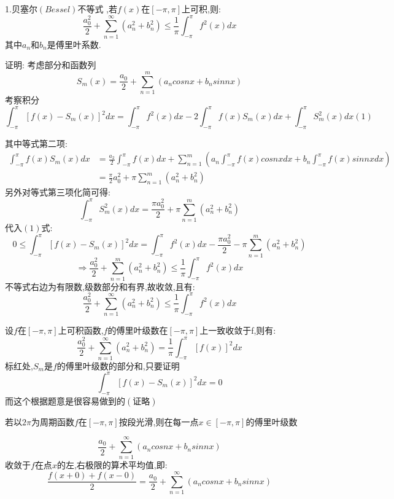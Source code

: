 \documentclass{ctexart}
\begin{document}
\begin{tcolorbox}[title = {贝塞尔不等式},colbacktitle=green!35!black,colback=green!1,arc = 3mm, outer arc = 3mm,fonttitle = \itshape, fontupper = \itshape, fontlower = \itshape]
 		1.贝塞尔$\left(Bessel \right) $不等式 ,若$f(x)$在$\left[-\pi ,\pi \right]$上可积,则:\\
 	$$\frac{a_{0}^{2}}{2}+\sum_{n=1}^{\infty}\left(a_{n}^{2}+b_{n}^{2} \right) \le \frac{1}{\pi}\int_{-\pi}^{\pi}f^{2}(x)dx $$其中$a_{n}$和$b_{n}$是傅里叶系数.

 	{\color{red}证明:}
 	 考虑部分和函数列$$S_{m}(x)=\frac{a_{0}}{2}+\sum_{n=1}^{m}\left( a_{n}cosnx+b_{n}sinnx\right) $$
 	 考察积分
 	$$
 	 \int_{-\pi}^{\pi}\left[f(x)-S_{m}(x)\right]^{2}dx=\int_{-\pi}^{\pi}f^{2}(x)dx-2\int_{-\pi}^{\pi}f(x)S_{m}(x)dx+\int_{-\pi}^{\pi}S_{m}^{2}(x)dx \left( {\text{1}}\right) 
 	 $$
 	 
 	 其中等式第二项:
 \begin{align*}
 	 	\int_{-\pi}^{\pi}f(x)S_{m}(x)dx&=\frac{a_{2}}{2}\int_{-\pi}^{\pi}f(x)dx+\sum_{n=1}^{m}\left(a_{n}\int_{-\pi}^{\pi}f(x)cosnxdx+b_{n}\int_{-\pi}^{\pi}f(x)sinnxdx\right)\\
 	 	&=\frac{\pi}{2}a_{0}^{2}+\pi\sum_{n=1}^{m}\left(a_{n}^{2}+b_{n}^{2}\right) 
 \end{align*}
  另外对等式第三项化简可得:$$\int_{-\pi}^{\pi}S_{m}^{2}(x)dx=\frac{\pi a_{0}^{2}}{2}+\pi\sum_{n=1}^{m}\left(a_{n}^{2}+b_{n}^{2}\right)$$
  代入$(1)$式:
  {\color{red}
   $$0 \le \int_{-\pi}^{\pi}\left[f(x)-S_{m}(x)\right]^{2}dx =\int_{-\pi}^{\pi}f^{2}(x)dx-\frac{\pi a_{0}^{2}}{2}-\pi\sum_{n=1}^{m}\left(a_{n}^{2}+b_{n}^{2} \right) $$}
   $$\Rightarrow \frac{ a_{0}^{2}}{2}+\sum_{n=1}^{m}\left(a_{n}^{2}+b_{n}^{2} \right) \le \frac{1}{\pi}\int_{-\pi}^{\pi}f^{2}(x)dx$$
   不等式右边为有限数,级数部分和有界,故收敛,且有:
   $$\frac{a_{0}^{2}}{2}+\sum_{n=1}^{\infty}\left(a_{n}^{2}+b_{n}^{2} \right) \le \frac{1}{\pi}\int_{-\pi}^{\pi}f^{2}(x)dx $$	
\end{tcolorbox}
\begin{tcolorbox}[title = {帕塞瓦尔等式},colbacktitle=green!35!black,colback=green!1,arc = 3mm, outer arc = 3mm,fonttitle = \itshape, fontupper = \itshape, fontlower = \itshape]
	设$f$在$[-\pi,\pi]$上可积函数,$f$的傅里叶级数在$[-\pi,\pi]$上一致收敛于f,则有:$$\frac{a_{0}^{2}}{2}+\sum_{n=1}^{\infty}\left(a_{n}^{2}+b_{n}^{2} \right) =\frac{1}{\pi}\int_{-\pi}^{\pi}[f(x)]^{2} dx $$
	标红处,$S_{m}$是$f$的傅里叶级数的部分和,只要证明$$\int_{-\pi}^{\pi}\left[f(x)-S_{m}(x)\right]^{2}dx=0$$
	{\color{red}而这个根据题意是很容易做到的$\left(\text{证略} \right) $}
\end{tcolorbox}
\begin{tcolorbox}[title = {收敛定理},colbacktitle=green!35!black,colback=green!1,arc = 3mm, outer arc = 3mm,fonttitle = \itshape, fontupper = \itshape, fontlower = \itshape]
   若以$2\pi$为周期函数$f$在$\left[-\pi,\pi \right]$按段光滑,则在每一点$x \in \left[-\pi,\pi \right] $的傅里叶级数
   
   $$\frac{a_{0}}{2}+\sum_{n=1}^{\infty}\left(a_{n}cosnx+b_{n}sinnx \right)$$
   收敛于$f$在点$x$的左,右极限的算术平均值,即:
   $$\frac{f\left(x+0 \right)+f\left(x-0 \right)}{2}=\frac{a_{0}}{2}+\sum_{n=1}^{\infty}\left(a_{n}cosnx+b_{n}sinnx \right)$$
\end{tcolorbox}
\end{document}
